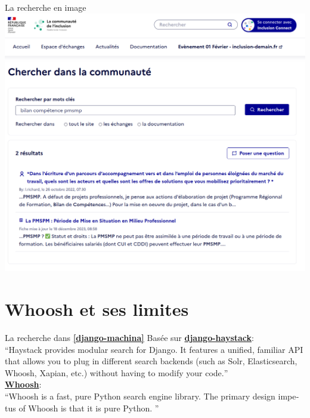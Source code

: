\documentclass{beamer}
\begin{document}
\begin{frame}{La recherche en image}
    \includegraphics[width=\textwidth]{Images/communaute-search.png}
\end{frame}

\section{Whoosh et ses limites} %

\begin{frame}{La recherche dans \href{https://github.com/ellmetha/django-machina/}{\textbf{[django-machina]}}}
    Basée sur \href{https://github.com/django-haystack/django-haystack}{\textbf{django-haystack}}:
    \vspace{15pt}
    \\
    \foreignquote{english}{Haystack provides modular search for Django. It
    features a unified, familiar API that allows you to plug in different
    search backends (such as Solr, Elasticsearch, Whoosh, Xapian, etc.) without
    having to modify your code.}
    \vspace{15pt}
    \\
    \href{https://github.com/mchaput/whoosh}{\textbf{Whoosh}}:
    \vspace{15pt}
    \\
    \foreignquote{english}{Whoosh is a fast, pure Python search engine library.
    The primary design impetus of Whoosh is that it is pure Python. }
\end{frame}
\end{document}
